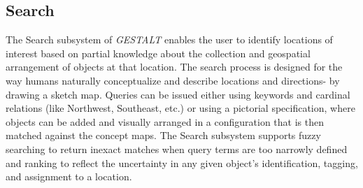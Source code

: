 
\subsection{Search}

The Search subsystem of \emph{GESTALT} enables the user to identify locations of interest based on partial knowledge about the collection and geospatial arrangement of objects at that location. 
The search process is designed for the way humans naturally conceptualize and describe locations and directions- by drawing a sketch map.
Queries can be issued either using keywords and cardinal relations (like Northwest, Southeast, etc.) or using a pictorial specification, where objects can be added and visually arranged in a configuration that is then matched against the concept maps.
The Search subsystem supports fuzzy searching to return inexact matches when query terms are too narrowly defined and ranking to reflect the uncertainty in any given object's identification, tagging, and assignment to a location.




